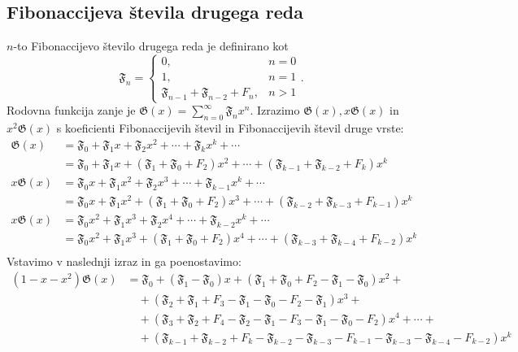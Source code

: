 \documentclass{article}
\begin{document}
    \subsection*{Fibonaccijeva števila drugega reda}

    $n$-to Fibonaccijevo število drugega reda je definirano kot
    $$ \mathfrak{F}_n = 
    \begin{cases}
        0, & n = 0 \\
        1, & n = 1 \\
        \mathfrak{F}_{n-1} + \mathfrak{F}_{n-2} + F_n, & n > 1
    \end{cases}
    \text{.} $$
    Rodovna funkcija zanje je $\mathfrak{G} (x) = \sum_{n=0}^{\infty} \mathfrak{F}_n x^n $.
    Izrazimo $\mathfrak{G} (x), x \mathfrak{G} (x)$ in $x^2 \mathfrak{G} (x)$ s koeficienti Fibonaccijevih 
    števil in Fibonaccijevih števil druge vrste:
    \begin{align*}
        \mathfrak{G} (x) &= \mathfrak{F}_0 + \mathfrak{F}_1 x + \mathfrak{F}_2 x^2 + \cdots + \mathfrak{F}_k x^k + \cdots \\
        &= \mathfrak{F}_0 + \mathfrak{F}_1 x + (\mathfrak{F}_1 + \mathfrak{F}_0 + F_2) x^2 + \cdots + (\mathfrak{F}_{k-1} + \mathfrak{F}_{k-2} + F_k) x^k \\
        x \mathfrak{G} (x) &= \mathfrak{F}_0 x + \mathfrak{F}_1 x^2 + \mathfrak{F}_2 x^3 + \cdots + \mathfrak{F}_{k-1} x^k + \cdots \\
        &= \mathfrak{F}_0 x + \mathfrak{F}_1 x^2 + (\mathfrak{F}_1 + \mathfrak{F}_0 + F_2) x^3 + \cdots + (\mathfrak{F}_{k-2} + \mathfrak{F}_{k-3} + F_{k-1}) x^k \\
        x \mathfrak{G} (x) &= \mathfrak{F}_0 x^2 + \mathfrak{F}_1 x^3 + \mathfrak{F}_2 x^4 + \cdots + \mathfrak{F}_{k-2} x^k + \cdots \\
        &= \mathfrak{F}_0 x^2 + \mathfrak{F}_1 x^3 + (\mathfrak{F}_1 + \mathfrak{F}_0 + F_2) x^4 + \cdots + (\mathfrak{F}_{k-3} + \mathfrak{F}_{k-4} + F_{k-2}) x^k \\
    \end{align*}
    Vstavimo v naslednji izraz in ga poenostavimo:
    \begin{align*}
        (1 - x - x^2) \mathfrak{G} (x) &= \mathfrak{F}_0 + (\mathfrak{F}_1 - \mathfrak{F}_0) x + (\mathfrak{F}_1 + \mathfrak{F}_0 + F_2 -\mathfrak{F}_1 - \mathfrak{F}_0) x^2 + \\
        &\quad + (\mathfrak{F}_2 + \mathfrak{F}_1 + F_3 - \mathfrak{F}_1 - \mathfrak{F}_0 - F_2 - \mathfrak{F}_1) x^3 + \\
        &\quad + (\mathfrak{F}_3 + \mathfrak{F}_2 + F_4 - \mathfrak{F}_2 - \mathfrak{F}_1 - F_3 - \mathfrak{F}_1 - \mathfrak{F}_0 - F_2) x^4 + \cdots + \\
        &\quad + (\mathfrak{F}_{k-1} + \mathfrak{F}_{k-2} + F_k - \mathfrak{F}_{k-2} - \mathfrak{F}_{k-3} - F_{k-1} - \mathfrak{F}_{k-3} - \mathfrak{F}_{k-4} - F_{k-2}) x^k
    \end{align*}
\end{document}
